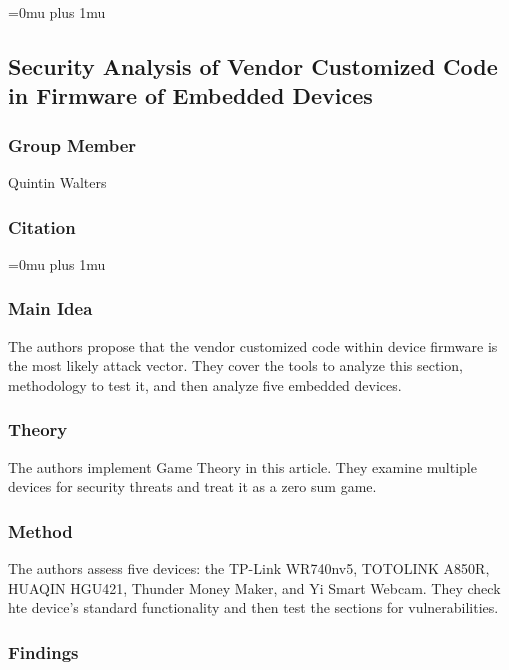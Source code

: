 \Urlmuskip=0mu plus 1mu\relax

\noindent
\subsection{Security Analysis of Vendor Customized Code in Firmware of Embedded Devices}

\subsubsection{Group Member}

\noindent
Quintin Walters

\noindent
\subsubsection{Citation}

\Urlmuskip=0mu plus 1mu\relax

\subsubsection{Main Idea}

\noindent
The authors propose that the vendor customized code within device firmware is the most likely attack vector.  They cover the tools to analyze this section, methodology to test it, and then analyze five embedded devices.

\subsubsection{Theory}

\noindent
The authors implement Game Theory in this article.  They examine multiple devices for security threats and treat it as a zero sum game.

\subsubsection{Method}

\noindent
The authors assess five devices: the TP-Link WR740nv5, TOTOLINK A850R, HUAQIN HGU421, Thunder Money Maker, and Yi Smart Webcam.  They check hte device's standard functionality and then test the sections for vulnerabilities.

\subsubsection{Findings}

